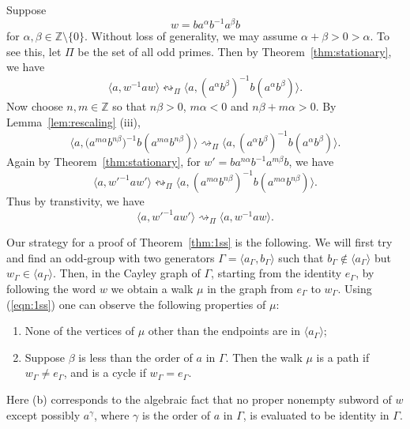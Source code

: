 \documentclass[11pt]{amsart}
\theoremstyle{definition}
\theoremstyle{definition}
\numberwithin{equation}{section}
\begin{document}
Suppose
\begin{equation}\label{eqn:1ss} w=ba^{\alpha}b^{-1}a^{\beta}b \end{equation}
for $\alpha, \beta\in \mathbb{Z}\setminus\{0\}$. Without loss of generality, we may assume $\alpha+\beta>0>\alpha$. To see this, let $\Pi$ be the set of all odd primes. Then by Theorem~\ref{thm:stationary}, we have
$$\langle a, w^{-1}aw\rangle\leftrightsquigarrow_\Pi\big\langle a, (a^{\alpha}b^{\beta})^{-1}b(a^{\alpha}b^{\beta})\big\rangle. $$ 
Now choose $n, m\in \mathbb{Z}$ so that $n\beta>0$, $m\alpha<0$ and $n\beta+m\alpha>0$. By Lemma~\ref{lem:rescaling} (iii), 
\begin{equation} \big\langle a, \big(a^{m\alpha}b^{n\beta})^{-1}b(a^{m\alpha}b^{n\beta})\big\rangle\rightsquigarrow_\Pi\big\langle a, (a^{\alpha}b^{\beta})^{-1}b(a^{\alpha}b^{\beta})\big\rangle. \end{equation}
Again by Theorem~\ref{thm:stationary}, for $w'=ba^{n\alpha}b^{-1}a^{m\beta}b$, we have
\begin{equation}\langle a, w'^{-1}aw'\rangle\leftrightsquigarrow_\Pi\big\langle a, (a^{m\alpha}b^{n\beta})^{-1}b(a^{m\alpha}b^{n\beta})\big\rangle.
\end{equation}
Thus by transtivity, we have
$$ \langle a, w'^{-1}aw'\rangle\rightsquigarrow_\Pi \langle a, w^{-1}aw\rangle. $$

Our strategy for a proof of Theorem~\ref{thm:1ss} is the following. We will first try and find an odd-group with two generators $\Gamma=\langle a_\Gamma, b_\Gamma\rangle$ such that $b_\Gamma\not\in \langle a_\Gamma\rangle$ but $w_\Gamma\in \langle a_\Gamma\rangle$. Then, in the Cayley graph of $\Gamma$, starting from the identity $e_\Gamma$, by following the word $w$ we obtain a walk $\mu$ in the graph from $e_\Gamma$ to $w_\Gamma$. Using (\ref{eqn:1ss}) one can observe the following properties of $\mu$:
\begin{enumerate}
\item[(a)] None of the vertices of $\mu$ other than the endpoints are in $\langle a_\Gamma\rangle$;
\item[(b)] Suppose $\beta$ is less than the order of $a$ in $\Gamma$. Then the walk $\mu$ is a path if $w_\Gamma\neq e_\Gamma$, and is a cycle if $w_\Gamma=e_\Gamma$.
\end{enumerate}
Here (b) corresponds to the algebraic fact that no proper nonempty subword of $w$ except possibly $a^\gamma$, where $\gamma$ is the order of $a$ in $\Gamma$, is evaluated to be identity in $\Gamma$. 
\end{document}
